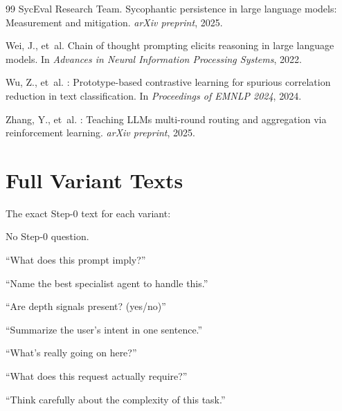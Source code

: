 \documentclass[11pt,a4paper]{article}
\begin{document}
\begin{thebibliography}{99}
{SycEval Research Team}.
\newblock Sycophantic persistence in large language models: Measurement and
  mitigation.
\newblock \emph{arXiv preprint}, 2025.

Wei, J., et~al.
\newblock Chain of thought prompting elicits reasoning in large language
  models.
\newblock In \emph{Advances in Neural Information Processing Systems}, 2022.

Wu, Z., et~al.
: Prototype-based contrastive learning for spurious
  correlation reduction in text classification.
\newblock In \emph{Proceedings of EMNLP 2024}, 2024.

Zhang, Y., et~al.
: Teaching LLMs multi-round routing and aggregation via
  reinforcement learning.
\newblock \emph{arXiv preprint}, 2025.

\end{thebibliography}

\appendix

\section{Full Variant Texts}
\label{app:variants}

The exact Step-0 text for each variant:

\begin{description}[noitemsep]
  \item[\textsf{base}] No Step-0 question.
  \item[\textsf{expl}] ``What does this prompt imply?''
  \item[\textsf{extr}] ``Name the best specialist agent to handle this.''
  \item[\textsf{gated}] ``Are depth signals present? (yes/no)''
  \item[\textsf{extr2}] ``Summarize the user's intent in one sentence.''
  \item[\textsf{expl2}] ``What's really going on here?''
  \item[\textsf{expl3}] ``What does this request actually require?''
  \item[\textsf{think}] ``Think carefully about the complexity of this task.''
\end{description}
\end{document}

